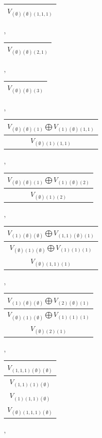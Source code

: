 \documentclass[letterpaper,11pt]{article}
\begin{document}
	\begin{tabular}{| c |}
		\hline
		$V_{(\emptyset)(\emptyset)(1,1,1)}$\\
		\hline
	\end{tabular}, 
	\begin{tabular}{| c |}
		\hline
		$V_{(\emptyset)(\emptyset)(2,1)}$\\
		\hline
	\end{tabular}, 
	\begin{tabular}{| c |}
		\hline
		$V_{(\emptyset)(\emptyset)(3)}$\\
		\hline
	\end{tabular}, 
	\begin{tabular}{| c |}
		\hline
		$V_{(\emptyset)(\emptyset)(1)}$$\bigoplus$$V_{(1)(\emptyset)(1,1)}$\\
		\hline
		$V_{(\emptyset)(1)(1,1)}$\\
		\hline
	\end{tabular}, 
	\begin{tabular}{| c |}
		\hline
		$V_{(\emptyset)(\emptyset)(1)}$$\bigoplus$$V_{(1)(\emptyset)(2)}$\\
		\hline
		$V_{(\emptyset)(1)(2)}$\\
		\hline
	\end{tabular}, 
	\begin{tabular}{| c |}
		\hline
		$V_{(1)(\emptyset)(\emptyset)}$$\bigoplus$$V_{(1,1)(\emptyset)(1)}$\\
		\hline
		$V_{(\emptyset)(1)(\emptyset)}$$\bigoplus$$V_{(1)(1)(1)}$\\
		\hline
		$V_{(\emptyset)(1,1)(1)}$\\
		\hline
	\end{tabular}, 
	\begin{tabular}{| c |}
		\hline
		$V_{(1)(\emptyset)(\emptyset)}$$\bigoplus$$V_{(2)(\emptyset)(1)}$\\
		\hline
		$V_{(\emptyset)(1)(\emptyset)}$$\bigoplus$$V_{(1)(1)(1)}$\\
		\hline
		$V_{(\emptyset)(2)(1)}$\\
		\hline
	\end{tabular}, 
	\begin{tabular}{| c |}
		\hline
		$V_{(1,1,1)(\emptyset)(\emptyset)}$\\
		\hline
		$V_{(1,1)(1)(\emptyset)}$\\
		\hline
		$V_{(1)(1,1)(\emptyset)}$\\
		\hline
		$V_{(\emptyset)(1,1,1)(\emptyset)}$\\
		\hline
	\end{tabular}, 
\end{document}
